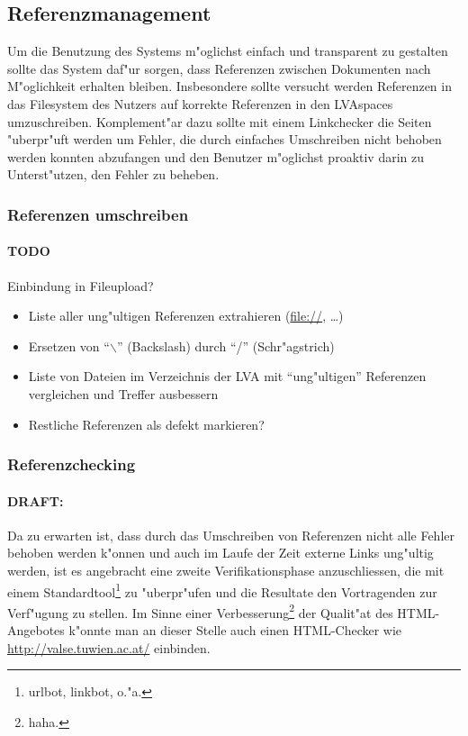 \documentclass[12pt,a4paper]{article}
\begin{document}
\subsection{Referenzmanagement}

Um die Benutzung des Systems m"oglichst einfach und transparent zu
gestalten sollte das System daf"ur sorgen, dass Referenzen zwischen
Dokumenten nach M"oglichkeit erhalten bleiben. Insbesondere sollte
versucht werden Referenzen in das Filesystem des Nutzers auf korrekte
Referenzen in den LVAspaces umzuschreiben. Komplement"ar dazu sollte mit
einem Linkchecker die Seiten "uberpr"uft werden um Fehler, die durch
einfaches Umschreiben nicht behoben werden konnten abzufangen und den
Benutzer m"oglichst proaktiv darin zu Unterst"utzen, den Fehler zu
beheben.

\subsubsection{Referenzen umschreiben}

\paragraph{TODO}{Einbindung in Fileupload?}

\begin{itemize}
\item{Liste aller ung"ultigen Referenzen extrahieren (\url{file://}, \dots)}
\item{Ersetzen von "`$\backslash$"' (Backslash) durch "`/"' (Schr"agstrich)}
\item{Liste von Dateien im Verzeichnis der LVA mit "`ung"ultigen"'
Referenzen vergleichen und Treffer ausbessern}
\item{Restliche Referenzen als defekt markieren?}
\end{itemize}

\subsubsection{Referenzchecking}

\paragraph{DRAFT:}{Da zu erwarten ist, dass durch das Umschreiben von
Referenzen nicht alle Fehler behoben werden k"onnen und auch im Laufe der
Zeit externe Links ung"ultig werden, ist es angebracht eine zweite
Verifikationsphase anzuschliessen, die mit einem
Standardtool\footnote{urlbot, linkbot, o."a.} zu "uberpr"ufen und die
Resultate den Vortragenden zur Verf"ugung zu stellen. Im Sinne einer
Verbesserung\footnote{haha.} der Qualit"at des HTML-Angebotes k"onnte man
an dieser Stelle auch einen HTML-Checker wie
\url{http://valse.tuwien.ac.at/} einbinden.}
\end{document}

